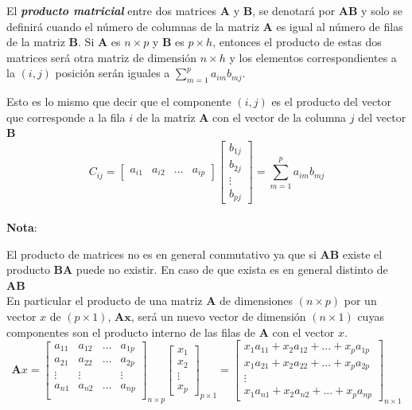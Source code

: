 \documentclass[12pt,letterpaper]{report} %
\begin{document}
El \textit{\textbf{producto matricial}} entre dos matrices $\mathbf{A}$ y $\mathbf{B}$, se denotará por $\mathbf{A}\mathbf{B}$ y solo se definirá cuando el número de columnas de la matriz $\mathbf{A}$ es igual al número de filas de la matriz $\mathbf{B}$. Si $\mathbf{A}$ es $n \times p$ y $\mathbf{B}$ es $p \times h$, entonces el producto de estas dos matrices será otra matriz de dimensión $n \times h$ y los elementos correspondientes a la $(i,j)$ posición serán iguales a $\sum_{m=1}^{p} a_{im}b_{mj}$.

Esto es lo mismo que decir que el componente $(i,j)$ es el producto del vector que corresponde a la fila $i$ de la matriz $\mathbf{A}$ con el vector de la columna $j$ del vector $\mathbf{B}$ 
$$
C_{ij}=\begin{bmatrix} a_{i1} & a_{i2} & ... & a_{ip} \end{bmatrix} \begin{bmatrix} b_{1j}\\ b_{2j} \\ \vdots \\ b_{pj}\end{bmatrix} =\sum_{m=1}^{p} a_{im}b_{mj}
$$
\\
\textbf{Nota}:

El producto de matrices no es en general conmutativo ya que si $\mathbf{A}\mathbf{B}$ existe el producto $\mathbf{B}\mathbf{A}$ puede no existir. En caso de que exista es en general distinto de $\mathbf{A}\mathbf{B}$
\\

En particular el producto de una matriz $\mathbf{A}$ de dimensiones $(n \times p)$ por un vector $x$ de $(p \times 1)$, $\mathbf{Ax}$, será un nuevo vector de dimensión $(n \times 1)$ cuyas componentes son el producto interno de las filas de $\mathbf{A}$ con el vector $x$.
$$
\mathbf{A}x=
\begin{bmatrix}
a_{11} & a_{12} & ... & a_{1p} \\
a_{21} & a_{22} & ... & a_{2p} \\
\vdots & \vdots &     & \vdots \\
a_{n1} & a_{n2} & ... & a_{np} \\
\end{bmatrix}_{n\times p}
\begin{bmatrix} x_1 \\ x_2 \\ \vdots \\ x_p\end{bmatrix}_{p\times 1}
= \begin{bmatrix} x_1a_{11}+x_2a_{12}+...+x_pa_{1p} \\ x_1a_{21}+x_2a_{22}+...+x_pa_{2p} \\ \vdots \\ x_1a_{n1}+x_2a_{n2}+...+x_p a_{np}\end{bmatrix}_{n\times 1}
$$
\\
\end{document}
